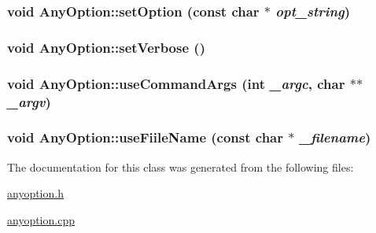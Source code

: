 \hypertarget{classAnyOption_a72320922fa1b9f02d7e744f517dcf479}{
\subsubsection[{setOption}]{\setlength{\rightskip}{0pt plus 5cm}void AnyOption::setOption (const char $\ast$ {\em opt\_\-string})}}
\label{classAnyOption_a72320922fa1b9f02d7e744f517dcf479}
\hypertarget{classAnyOption_a0db06dc9828c5242889610afcc740141}{
\subsubsection[{setVerbose}]{\setlength{\rightskip}{0pt plus 5cm}void AnyOption::setVerbose ()}}
\label{classAnyOption_a0db06dc9828c5242889610afcc740141}
\hypertarget{classAnyOption_a632154043f99bf2186f23b4eaaa297c8}{
\subsubsection[{useCommandArgs}]{\setlength{\rightskip}{0pt plus 5cm}void AnyOption::useCommandArgs (int {\em \_\-argc}, \/  char $\ast$$\ast$ {\em \_\-argv})}}
\label{classAnyOption_a632154043f99bf2186f23b4eaaa297c8}
\hypertarget{classAnyOption_a5b50b3fe6804f0ddce1a94a36d5cc29f}{
\subsubsection[{useFiileName}]{\setlength{\rightskip}{0pt plus 5cm}void AnyOption::useFiileName (const char $\ast$ {\em \_\-filename})}}
\label{classAnyOption_a5b50b3fe6804f0ddce1a94a36d5cc29f}


The documentation for this class was generated from the following files:\begin{DoxyCompactItemize}
\item 
\hyperlink{anyoption_8h}{anyoption.h}\item 
\hyperlink{anyoption_8cpp}{anyoption.cpp}\end{DoxyCompactItemize}
